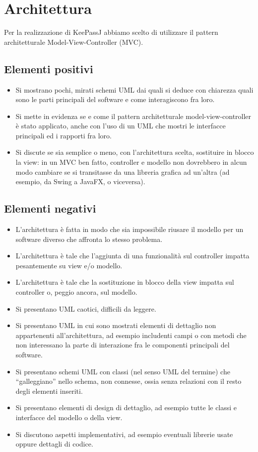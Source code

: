 \documentclass[a4paper,12pt]{report}
\begin{document}
\section{Architettura}

Per la realizzazione di KeePassJ abbiamo scelto di utilizzare il pattern architetturale
Model-View-Controller (MVC).

\subsection*{Elementi positivi}
\begin{itemize}
 \item Si mostrano pochi, mirati schemi UML dai quali si deduce con chiarezza quali sono le parti principali del software e come interagiscono fra loro.
 \item Si mette in evidenza se e come il pattern architetturale model-view-controller è stato applicato, anche con l'uso di un UML che mostri le interfacce principali ed i rapporti fra loro.
 \item Si discute se sia semplice o meno, con l'architettura scelta, sostituire in blocco la view: in un MVC ben fatto, controller e modello non dovrebbero in alcun modo cambiare se si transitasse da una libreria grafica ad un'altra (ad esempio, da Swing a JavaFX, o viceversa).
\end{itemize}

\subsection*{Elementi negativi}
\begin{itemize}
 \item L'architettura è fatta in modo che sia impossibile riusare il modello per un software diverso che affronta lo stesso problema.
 \item L'architettura è tale che l'aggiunta di una funzionalità sul controller impatta pesantemente su view e/o modello.
 \item L'architettura è tale che la sostituzione in blocco della view impatta sul controller o, peggio ancora, sul modello.
 \item Si presentano UML caotici, difficili da leggere.
 \item Si presentano UML in cui sono mostrati elementi di dettaglio non appartenenti all'architettura, ad esempio includenti campi o con metodi che non interessano la parte di interazione fra le componenti principali del software.
 \item Si presentano schemi UML con classi (nel senso UML del termine) che ``galleggiano'' nello schema, non connesse, ossia senza relazioni con il resto degli elementi inseriti.
 \item Si presentano elementi di design di dettaglio, ad esempio tutte le classi e interfacce del modello o della view.
 \item Si discutono aspetti implementativi, ad esempio eventuali librerie usate oppure dettagli di codice.
\end{itemize}
\end{document}
